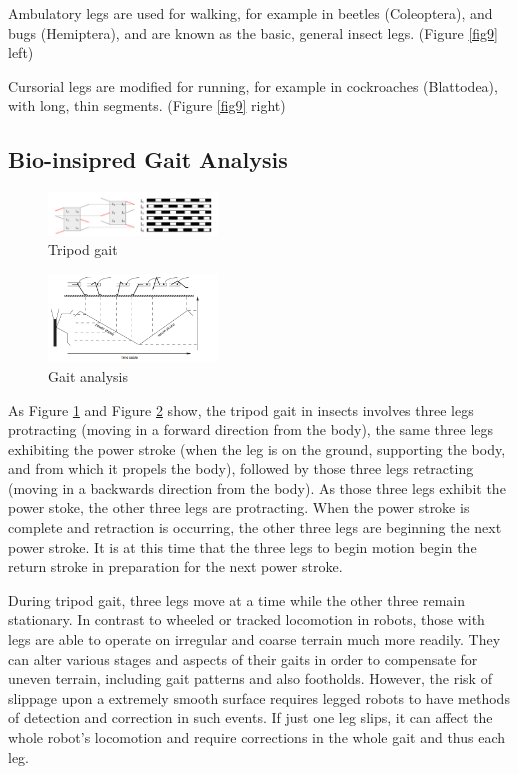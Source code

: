 \documentclass[conference]{IEEEtran}
\begin{document}
Ambulatory legs are used for walking, for example in beetles (Coleoptera), and bugs (Hemiptera), and are known as the basic, general insect legs. (Figure \ref{fig9} left)\cite{b3}

Cursorial legs are modified for running, for example in cockroaches (Blattodea), with long, thin segments. (Figure \ref{fig9} right)\cite{b3}

\subsection{Bio-insipred Gait Analysis}\label{ss}
\begin{figure}
    \centerline{\includegraphics[width=0.4\textwidth]{tri.png}}
    \caption{Tripod gait}
    \label{fig6}
\end{figure}

\begin{figure}
    \centerline{\includegraphics[width=0.4\textwidth]{gait.png}}
    \caption{Gait analysis}
    \label{fig7}
\end{figure}

As Figure \ref{fig6} and Figure \ref{fig7} show, the tripod gait in insects involves three legs protracting (moving in a forward direction from the body), the same three legs exhibiting the power stroke (when the leg is on the ground, supporting the body, and from which it propels the body), followed by those three legs retracting (moving in a backwards direction from the body). As those three legs exhibit the power stoke, the other three legs are protracting. When the power stroke is complete and retraction is occurring, the other three legs are beginning the next power stroke. It is at this time that the three legs to begin motion begin the return stroke in preparation for the next power stroke.\cite{b4}

During tripod gait, three legs move at a time while the other three remain stationary. In contrast to wheeled or tracked locomotion in robots, those with legs are able to operate on irregular and coarse terrain much more readily. They can alter various stages and aspects of their gaits in order to compensate for uneven terrain, including gait patterns and also footholds. However, the risk of slippage upon a extremely smooth surface requires legged robots to have methods of detection and correction in such events. If just one leg slips, it can affect the whole robot’s locomotion and require corrections in the whole gait and thus each leg.\cite{b5}
\end{document}
